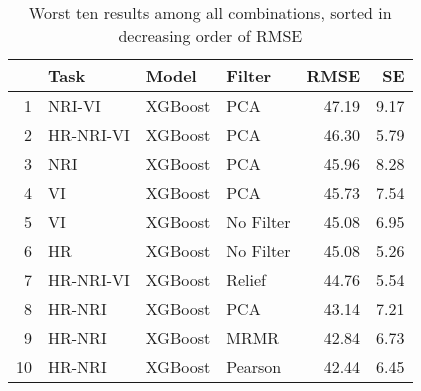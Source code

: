 \begin{table}[ht!]
\centering
\caption{Worst ten results among all combinations, sorted in decreasing order of RMSE} 
\label{tab:perf-worst-10}
\begin{tabular}{rlllrr}
  \hline
 & Task & Model & Filter & RMSE & SE \\ 
  \hline
1 & NRI-VI & XGBoost & PCA & 47.19 & 9.17 \\ 
  2 & HR-NRI-VI & XGBoost & PCA & 46.30 & 5.79 \\ 
  3 & NRI & XGBoost & PCA & 45.96 & 8.28 \\ 
  4 & VI & XGBoost & PCA & 45.73 & 7.54 \\ 
  5 & VI & XGBoost & No Filter & 45.08 & 6.95 \\ 
  6 & HR & XGBoost & No Filter & 45.08 & 5.26 \\ 
  7 & HR-NRI-VI & XGBoost & Relief & 44.76 & 5.54 \\ 
  8 & HR-NRI & XGBoost & PCA & 43.14 & 7.21 \\ 
  9 & HR-NRI & XGBoost & MRMR & 42.84 & 6.73 \\ 
  10 & HR-NRI & XGBoost & Pearson & 42.44 & 6.45 \\ 
   \hline
\end{tabular}
\end{table}
